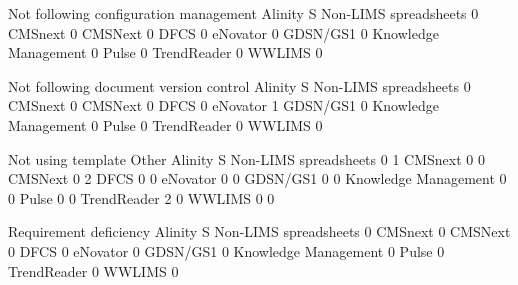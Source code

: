 \documentclass{article}
\begin{document}
\begin{Schunk}
\begin{Soutput}
                                  Not following configuration management
  Alinity S Non-LIMS spreadsheets                                      0
  CMSnext                                                              0
  CMSNext                                                              0
  DFCS                                                                 0
  eNovator                                                             0
  GDSN/GS1                                                             0
  Knowledge Management                                                 0
  Pulse                                                                0
  TrendReader                                                          0
  WWLIMS                                                               0

                                  Not following document version control
  Alinity S Non-LIMS spreadsheets                                      0
  CMSnext                                                              0
  CMSNext                                                              0
  DFCS                                                                 0
  eNovator                                                             1
  GDSN/GS1                                                             0
  Knowledge Management                                                 0
  Pulse                                                                0
  TrendReader                                                          0
  WWLIMS                                                               0

                                  Not using template Other
  Alinity S Non-LIMS spreadsheets                  0     1
  CMSnext                                          0     0
  CMSNext                                          0     2
  DFCS                                             0     0
  eNovator                                         0     0
  GDSN/GS1                                         0     0
  Knowledge Management                             0     0
  Pulse                                            0     0
  TrendReader                                      2     0
  WWLIMS                                           0     0

                                  Requirement deficiency
  Alinity S Non-LIMS spreadsheets                      0
  CMSnext                                              0
  CMSNext                                              0
  DFCS                                                 0
  eNovator                                             0
  GDSN/GS1                                             0
  Knowledge Management                                 0
  Pulse                                                0
  TrendReader                                          0
  WWLIMS                                               0
\end{Soutput}
\end{Schunk}
\end{document}
